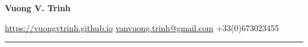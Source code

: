 \documentclass[a4paper,11pt]{article}
\begin{document}
{\hspace*{-\marginparsep minus \marginparwidth} 
\begin{minipage}[t]{\textwidth+\marginparwidth+\marginparsep} 
\centering
{\Large \bfseries {Vuong V. Trinh}} 

\vspace{0.2cm} 

\faGlobe \hspace{0.05cm} \href{https://vuongvtrinh.github.io}{https://vuongvtrinh.github.io} 
\hspace{0.05cm} \faEnvelope \hspace{0.05cm} \href{mailto:vanvuong.trinh@gmail.com}{vanvuong.trinh@gmail.com}
\hspace{0.05cm} \faPhone \hspace{0.05cm} {\color{darkblue} +33(0)673023455}

\rule{\columnwidth}{1pt}
\end{minipage}}

\vspace{0.5cm}
\end{document}
